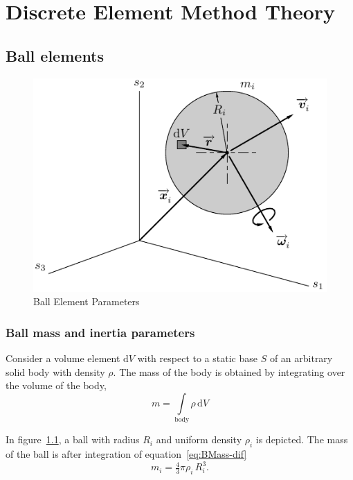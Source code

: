 \chapter{Discrete Element Method Theory}
\label{chp:DEM-Theory}

\section{Ball elements}
\label{sec:Ball-elems}

\begin{figure}
   \centering
   \includegraphics{figs/DEM-Def-Ball}
   \caption{Ball Element Parameters}
   \label{fig:BallDef}
\end{figure}


\subsection{Ball mass and inertia parameters}

Consider a volume element $\mathrm{d}V$ with respect to a static base $S$ of
an arbitrary solid body with  density $\rho$. The mass of the body is
obtained by integrating over the volume of the body,
\begin{equation}
    m = \int\limits_{\mathrm{body}} \rho\, \mathrm{d}V
    \label{eq:BMass-dif}
\end{equation}

In figure~\ref{fig:BallDef}, a ball with radius $R_{i}$ and uniform density
$\rho_i$ is depicted. The mass of the ball is after integration of
equation~\eqref{eq:BMass-dif}
\begin{equation}
    m_i = \tfrac{4}{3} \pi \rho_i\, R_i^3 .
    \label{eq:BMass}
\end{equation}


\endinput
